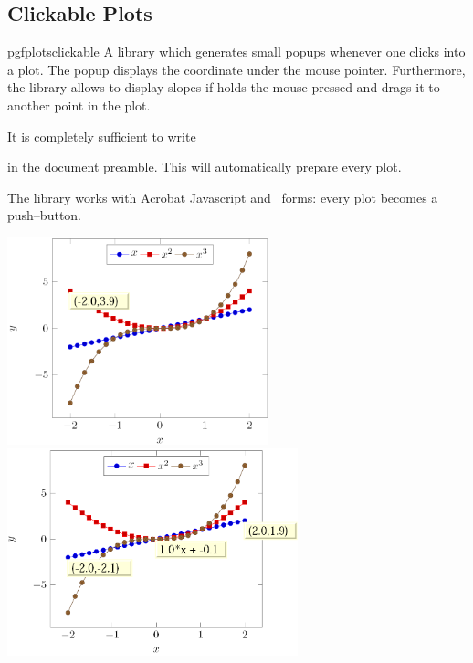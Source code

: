 \subsection{Clickable Plots}
\begin{tikzlibrary}{pgfplotsclickable}
	A library which generates small popups whenever one clicks into a plot. The popup displays the coordinate under the mouse pointer. Furthermore, the library allows to display slopes if holds the mouse pressed and drags it to another point in the plot.

	It is completely sufficient to write
\begin{codeexample}
\usetikzlibrary{pgfplotsclickable}
\end{codeexample}
	\noindent in the document preamble. This will automatically prepare every plot.

	The library works with Acrobat Javascript and \pdf\ forms: every plot becomes a push--button. 

	\includegraphics[height=6cm]{figures/pgfplotsclickable-fig1.png}
	\includegraphics[height=6cm]{figures/pgfplotsclickable-fig2.png}


\end{tikzlibrary}
